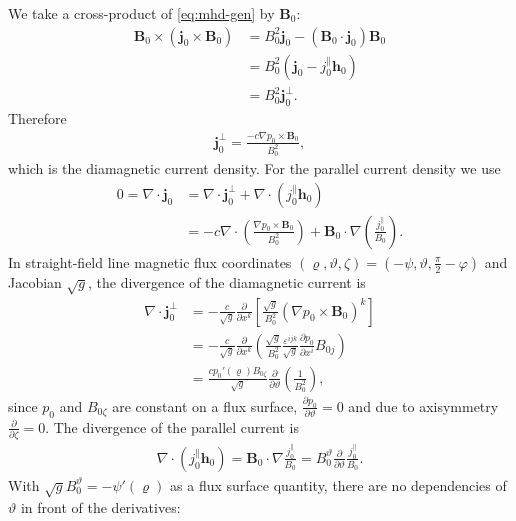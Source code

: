 \documentclass[a4paper, 10pt, english]{article}
\let\temp\varrho
\let\varrho\rho
\let\rho\temp
\let\temp\vartheta
\let\vartheta\theta
\let\theta\temp
\let\temp\varphi
\let\varphi\phi
\let\phi\temp
\let\vec\symbf
\newcommand*\pd[2][]{\ensuremath{\frac{\partial #1}{\partial #2}}}  %
\begin{document}
We take a cross-product of \cref{eq:mhd-gen} by $\vec{B}_{0}$:
\begin{align}
  \vec{B}_{0} \times \left( \vec{j}_{0} \times \vec{B}_{0} \right) &= B_{0}^{2} \vec{j}_{0} - (\vec{B}_{0} \cdot \vec{j}_{0}) \vec{B}_{0} \nonumber \\
  &= B_{0}^{2} (\vec{j}_{0} - j_{0}^{\parallel} \vec{h}_{0}) \nonumber \\
  &= B_{0}^{2} \vec{j}_{0}^{\perp}.
\end{align}
Therefore
\begin{gather}
  \vec{j}_{0}^{\perp} = \frac{-c \nabla p_{0} \times \vec{B}_{0}}{B_{0}^{2}},
\end{gather}
which is the diamagnetic current density. For the parallel current density we use
\begin{align}
 0 = \nabla \cdot \vec{j}_{0} &= \nabla \cdot \vec{j}_{0}^{\perp} + \nabla \cdot (j_{0}^{\parallel} \vec{h}_{0}) \nonumber \\
 &= -c \nabla \cdot \left( \frac{\nabla p_{0} \times \vec{B}_{0}}{B_{0}^{2}} \right) + \vec{B}_{0} \cdot \nabla \left( \frac{j_{0}^{\parallel}}{B_{0}} \right).
\end{align}
In straight-field line magnetic flux coordinates $(\rho, \theta, \zeta) = (-\psi, \theta, \frac{\pi}{2} - \phi)$ and Jacobian $\sqrt{g}$, the divergence of the diamagnetic current is
\begin{align}
  \nabla \cdot \vec{j}_{0}^{\perp} &= -\frac{c}{\sqrt{g}} \pd{x^{k}} \left[ \frac{\sqrt{g}}{B_{0}^{2}} \left( \nabla p_{0} \times \vec{B}_{0} \right)^{k} \right] \nonumber \\
  &= -\frac{c}{\sqrt{g}} \pd{x^{k}} \left( \frac{\sqrt{g}}{B_{0}^{2}} \frac{\varepsilon^{ijk}}{\sqrt{g}} \pd[p_{0}]{x^{i}} B_{0 j} \right) \nonumber \\
  &= \frac{c p_{0}' (\rho) B_{0 \zeta}}{\sqrt{g}} \pd{\theta} \left( \frac{1}{B_{0}^{2}} \right),
\end{align}
since $p_{0}$ and $B_{0 \zeta}$ are constant on a flux surface, $\pd[p_{0}]{\theta} = 0$ and due to axisymmetry $\pd{\zeta} = 0$. The divergence of the parallel current is
\begin{gather}
  \nabla \cdot(j_{0}^{\parallel} \vec{h}_{0}) = \vec{B}_{0} \cdot \nabla \frac{j_{0}^{\parallel}}{B_{0}} = B_{0}^{\theta} \pd{\theta} \frac{j_{0}^{\parallel}}{B_{0}}.
\end{gather}
With $\sqrt{g} B_{0}^{\theta} = -\psi'(\rho)$ as a flux surface quantity, there are no dependencies of $\theta$ in front of the derivatives:
\end{document}
